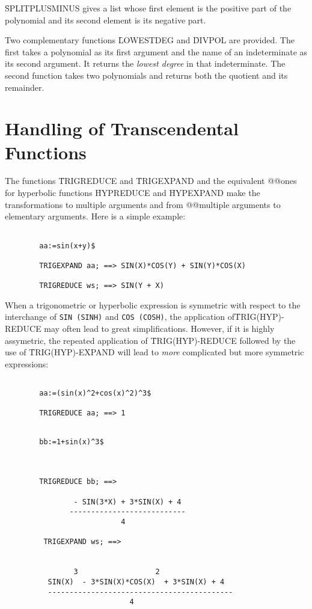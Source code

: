 \f{SPLITPLUSMINUS}  gives a list whose first element is the positive
part of the polynomial and its second element is its negative part.
\item[iii.]
Two complementary functions \f{LOWESTDEG} and \f{DIVPOL} are provided.
The first takes a polynomial as its first argument and the name of an
indeterminate as its second argument. It returns the {\em lowest degree}
 in that indeterminate. The second function takes two polynomials and
returns both the quotient and its remainder.
\ei
\section{Handling of Transcendental Functions}
The functions \f{TRIGREDUCE} and \f{TRIGEXPAND} and the equivalent
@@ones for hyperbolic functions \f{HYPREDUCE} and \f{HYPEXPAND}
make the transformations to multiple arguments and from
@@multiple arguments to elementary arguments. Here is a simple example:
\begin{verbatim}

        aa:=sin(x+y)$

        TRIGEXPAND aa; ==> SIN(X)*COS(Y) + SIN(Y)*COS(X)

        TRIGREDUCE ws; ==> SIN(Y + X)

\end{verbatim}
When a trigonometric or hyperbolic expression is symmetric with
respect to the interchange of {\tt SIN (SINH)} and {\tt COS (COSH)},
the application of\nl \f{TRIG(HYP)-REDUCE} may often lead to great
simplifications. However, if it is highly assymetric, the repeated
application of \f{TRIG(HYP)-REDUCE} followed by the use of
\f{TRIG(HYP)-EXPAND} will lead to {\em more} complicated
but more symmetric expressions:
\begin{verbatim}

        aa:=(sin(x)^2+cos(x)^2)^3$

        TRIGREDUCE aa; ==> 1

\end{verbatim}
\begin{verbatim}

        bb:=1+sin(x)^3$



        TRIGREDUCE bb; ==>

                - SIN(3*X) + 3*SIN(X) + 4
               ---------------------------
                           4

         TRIGEXPAND ws; ==>


                3                  2
          SIN(X)  - 3*SIN(X)*COS(X)  + 3*SIN(X) + 4
          -------------------------------------------
                             4

\end{verbatim}

